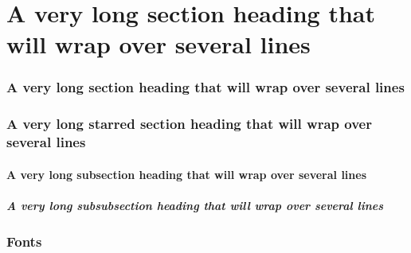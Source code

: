 \documentclass[a4paper,serif]{module}       %
\begin{document}
%

\part{A very long section heading that will wrap over several lines}

\section{A very long section heading that will wrap over several lines}

\section*{A very long starred section heading that will wrap over several lines}

\subsection{A very long subsection heading that will wrap over several lines}

\subsubsection{A very long subsubsection heading that will wrap over several lines}

\section{Fonts}


%
%
%
%
\end{document}
